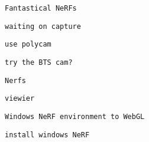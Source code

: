\begin{verbatim}
Fantastical NeRFs
\end{verbatim}

       
       
        \protect\hypertarget{ID_1290598733}{}{}

\begin{verbatim}
waiting on capture
\end{verbatim}

         
         
          \protect\hypertarget{ID_1815259586}{}{}

\begin{verbatim}
use polycam
\end{verbatim}
         

         
         
          \protect\hypertarget{ID_1315444282}{}{}

\begin{verbatim}
try the BTS cam?
\end{verbatim}
         
       

       
       
        \protect\hypertarget{ID_1137230659}{}{}

\begin{verbatim}
Nerfs
\end{verbatim}
       

       
       
        \protect\hypertarget{ID_51747702}{}{}

\begin{verbatim}
viewier
\end{verbatim}
       

       
       
        \protect\hypertarget{ID_1751038439}{}{}

\begin{verbatim}
Windows NeRF environment to WebGL
\end{verbatim}

         
         
          \protect\hypertarget{ID_986582555}{}{}

\begin{verbatim}
install windows NeRF
\end{verbatim}
         
       

       
       
        \protect\hypertarget{ID_1925332958}{}{}

